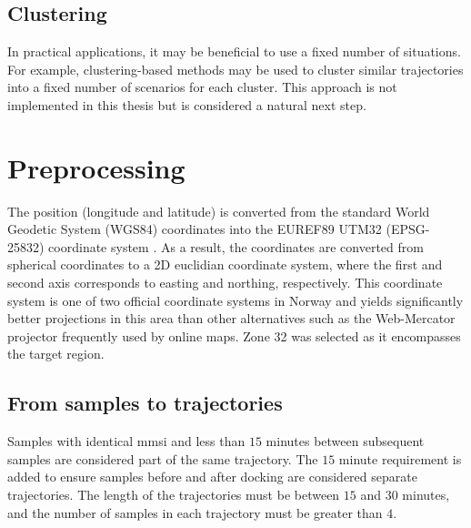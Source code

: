 \subsection{Clustering}
In practical applications, it may be beneficial to use a fixed number of situations. For example, clustering-based methods may be used to cluster similar trajectories into a fixed number of scenarios for each cluster. This approach is not implemented in this thesis but is considered a natural next step.


\section{Preprocessing}
The position (longitude and latitude) is converted from the standard World Geodetic System (WGS84) coordinates into the EUREF89 UTM32 (EPSG-25832) coordinate system \cite{kartverket}.  As a result, the coordinates are converted from spherical coordinates to a 2D euclidian coordinate system, where the first and second axis corresponds to easting and northing, respectively. This coordinate system is one of two official coordinate systems in Norway and yields significantly better projections in this area than other alternatives such as the Web-Mercator projector frequently used by online maps. Zone 32 was selected as it encompasses the target region.

\subsection{From samples to trajectories}\label{sec:from_ais_to_traj}
Samples with identical \acrshort{mmsi} and less than $15$ minutes between subsequent samples are considered part of the same trajectory. The $15$ minute requirement is added to ensure samples before and after docking are considered separate trajectories. The length of the trajectories must be between $15$ and $30$ minutes, and the number of samples in each trajectory must be greater than $4$. 
